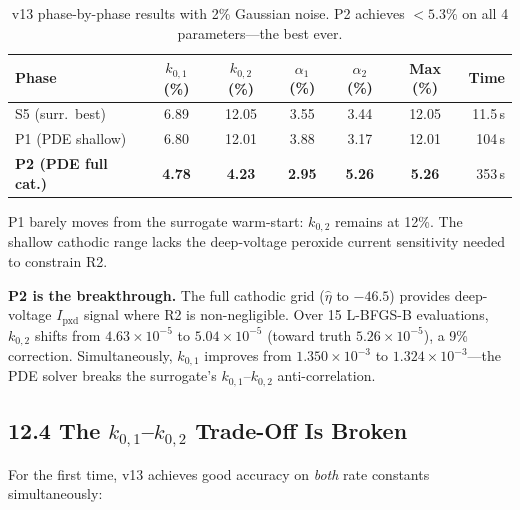 \documentclass[11pt]{article}
\begin{document}
\begin{table}[H]
  \centering
  \caption{v13 phase-by-phase results with 2\% Gaussian noise.
           P2 achieves $<5.3\%$ on all 4 parameters---the best ever.}
  \label{tab:v13_phases}
  \begin{tabular}{l S[round-precision=2] S[round-precision=2]
                    S[round-precision=2] S[round-precision=2]
                    S[round-precision=2] r}
    \toprule
    Phase & {$k_{0,1}$ (\%)} & {$k_{0,2}$ (\%)}
          & {$\alpha_1$ (\%)} & {$\alpha_2$ (\%)}
          & {Max (\%)} & {Time} \\
    \midrule
    S5 (surr.\ best)      &  6.89 & 12.05 & 3.55 & 3.44 & 12.05 & 11.5\,s \\
    P1 (PDE shallow)       &  6.80 & 12.01 & 3.88 & 3.17 & 12.01 & 104\,s  \\
    \textbf{P2 (PDE full cat.)}
                           &\textbf{4.78} & \textbf{4.23} & \textbf{2.95}
                           & \textbf{5.26} &\textbf{5.26} & 353\,s  \\
    \bottomrule
  \end{tabular}
\end{table}

P1 barely moves from the surrogate warm-start: $k_{0,2}$ remains at 12\%.
The shallow cathodic range lacks the deep-voltage peroxide current sensitivity
needed to constrain R2.

\textbf{P2 is the breakthrough.}  The full cathodic grid ($\hat\eta$ to
$-46.5$) provides deep-voltage $I_{\text{pxd}}$ signal where R2 is
non-negligible.  Over 15 L-BFGS-B evaluations, $k_{0,2}$ shifts from
$4.63 \times 10^{-5}$ to $5.04 \times 10^{-5}$ (toward truth
$5.26 \times 10^{-5}$), a 9\% correction.  Simultaneously, $k_{0,1}$
improves from $1.350 \times 10^{-3}$ to $1.324 \times 10^{-3}$---the PDE
solver breaks the surrogate's $k_{0,1}$--$k_{0,2}$ anti-correlation.

\subsection*{12.4 The $k_{0,1}$--$k_{0,2}$ Trade-Off Is Broken}

For the first time, v13 achieves good accuracy on \textit{both} rate constants
simultaneously:
\end{document}
